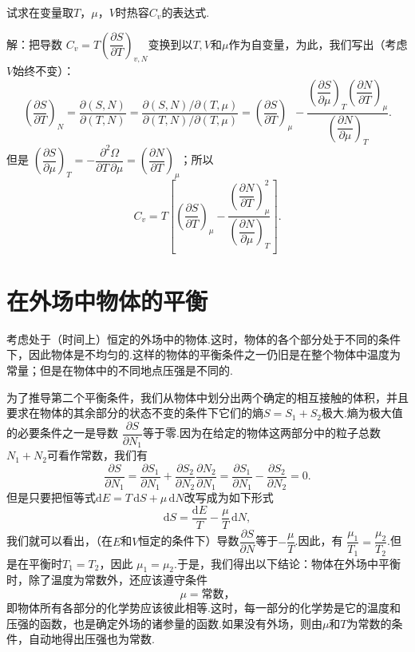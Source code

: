 \begin{xiti}

试求在变量取$T$，$\mu$，$V$时热容$C_v$的表达式.

解：把导数
$C_v=T\left(\dfrac{\partial S}{\partial T}\right)_{v,N}$变换到以$T,V$和$\mu$作为自变量，为此，我们写出（考虑$V$始终不变）：
\begin{equation*}
  \left(\frac{\partial S}{\partial T}\right)_N
  =\frac{\partial(S,N)}{\partial(T,N)}
  =\frac{\partial(S,N)/\partial(T,\mu)}
  {\partial(T,N)/\partial(T,\mu)}
  =\left(\frac{\partial S}{\partial T}\right)_\mu
  -\frac{\left(\dfrac{\partial S}{\partial\mu}\right)_T
  \left(\dfrac{\partial N}{\partial T}\right)_\mu}
  {\left(\dfrac{\partial N}{\partial\mu}\right)_T}.
\end{equation*}
但是
$\left(\dfrac{\partial S}{\partial\mu}\right)_T
=-\dfrac{\partial^2\Omega}{\partial T\,\partial\mu}
=\left(\dfrac{\partial N}{\partial T}\right)_\mu$；所以
\begin{equation*}
  C_v=T\left[\left(\frac{\partial S}{\partial T}\right)_\mu
  -\frac{\left(\dfrac{\partial N}{\partial T}\right)_\mu^2}
  {\left(\dfrac{\partial N}{\partial\mu}\right)_T}\right].
\end{equation*}

\end{xiti}

\section{在外场中物体的平衡}

考虑处于（时间上）恒定的外场中的物体.这时，物体的各个部分处于不同的条件下，因此物体是不均匀的.这样的物体的平衡条件之一仍旧是在整个物体中温度为常量；但是在物体中的不同地点压强是不同的.

为了推导第二个平衡条件，我们从物体中划分出两个确定的相互接触的体积，并且要求在物体的其余部分的状态不变的条件下它们的熵$S=S_1+S_2$极大.熵为极大值的必要条件之一是导数
$\dfrac{\partial S}{\partial N_1}$等于零.因为在给定的物体这两部分中的粒子总数$N_1+N_2$可看作常数，我们有
\begin{equation*}
  \frac{\partial S}{\partial N_1}
  =\frac{\partial S_1}{\partial N_1}
  +\frac{\partial S_2}{\partial N_2}
  \frac{\partial N_2}{\partial N_1}
  =\frac{\partial S_1}{\partial N_1}
  -\frac{\partial S_2}{\partial N_2}=0.
\end{equation*}
但是只要把恒等式$\mathrm{d}E=T\,\mathrm{d}S+\mu\,\mathrm{d}N$改写成为如下形式
\begin{equation*}
  \mathrm{d}S=\frac{\mathrm{d}E}{T}
  -\frac{\mu}{T}\,\mathrm{d}N,
\end{equation*}
我们就可以看出，（在$E$和$V$恒定的条件下）导数$\dfrac{\partial S}{\partial N}$等于$-\dfrac{\mu}{T}$.因此，有
$\dfrac{\mu_1}{T_1}=\dfrac{\mu_2}{T_2}$.但是在平衡时$T_1=T_2$，因此
$\mu_1=\mu_2$.于是，我们得出以下结论：物体在外场中平衡时，除了温度为常数外，还应该遵守条件
\begin{equation}
  \mu=\text{常数，}
\end{equation}
即物体所有各部分的化学势应该彼此相等.这时，每一部分的化学势是它的温度和压强的函数，也是确定外场的诸参量的函数.如果没有外场，则由$\mu$和$T$为常数的条件，自动地得出压强也为常数.


